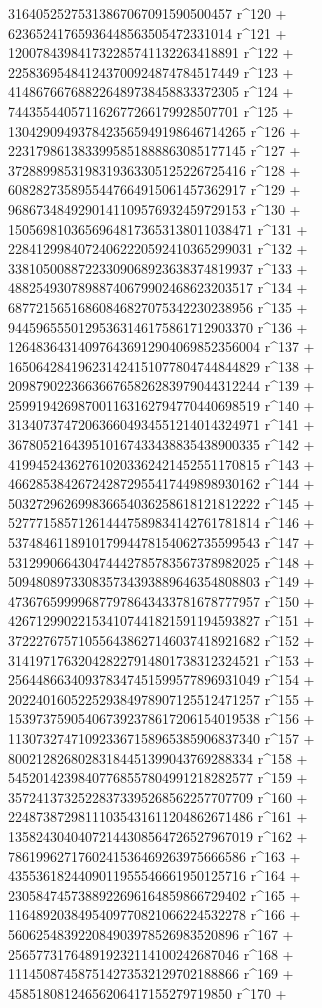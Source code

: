        31640525275313867067091590500457 r^120 + 
       62365241765936448563505472331014 r^121 + 
       120078439841732285741132263418891 r^122 + 
       225836954841243700924874784517449 r^123 + 
       414867667688226489738458833372305 r^124 + 
       744355440571162677266179928507701 r^125 + 
       1304290949378423565949198646714265 r^126 + 
       2231798613833995851888863085177145 r^127 + 
       3728899853198319363305125226725416 r^128 + 
       6082827358955447664915061457362917 r^129 + 
       9686734849290141109576932459729153 r^130 + 
       15056981036569648173653138011038471 r^131 + 
       22841299840724062220592410365299031 r^132 + 
       33810500887223309068923638374819937 r^133 + 
       48825493078988740679902468623203517 r^134 + 
       68772156516860846827075342230238956 r^135 + 
       94459655501295363146175861712903370 r^136 + 
       126483643140976436912904069852356004 r^137 + 
       165064284196231424151077804744844829 r^138 + 
       209879022366366765826283979044312244 r^139 + 
       259919426987001163162794770440698519 r^140 + 
       313407374720636604934551214014324971 r^141 + 
       367805216439510167433438835438900335 r^142 + 
       419945243627610203362421452551170815 r^143 + 
       466285384267242872955417449898930162 r^144 + 
       503272962699836654036258618121812222 r^145 + 
       527771585712614447589834142761781814 r^146 + 
       537484611891017994478154062735599543 r^147 + 
       531299066430474442785783567378982025 r^148 + 
       509480897330835734393889646354808803 r^149 + 
       473676599996877978643433781678777957 r^150 + 
       426712990221534107441821591194593827 r^151 + 
       372227675710556438627146037418921682 r^152 + 
       314197176320428227914801738312324521 r^153 + 
       256448663409378347451599577896931049 r^154 + 
       202240160522529384978907125512471257 r^155 + 
       153973759054067392378617206154019538 r^156 + 
       113073274710923367158965385906837340 r^157 + 
       80021282680283184451399043769288334 r^158 + 
       54520142398407768557804991218282577 r^159 + 
       35724137325228373395268562257707709 r^160 + 
       22487387298111035431611204862671486 r^161 + 
       13582430404072144308564726527967019 r^162 + 
       7861996271760241536469263975666586 r^163 + 
       4355361824409011955546661950125716 r^164 + 
       2305847457388922696164859866729402 r^165 + 
       1164892038495409770821066224532278 r^166 + 
       560625483922084903978526983520896 r^167 + 
       256577317648919232114100242687046 r^168 + 
       111450874587514273532129702188866 r^169 + 
       45851808124656206417155279719850 r^170 + 
